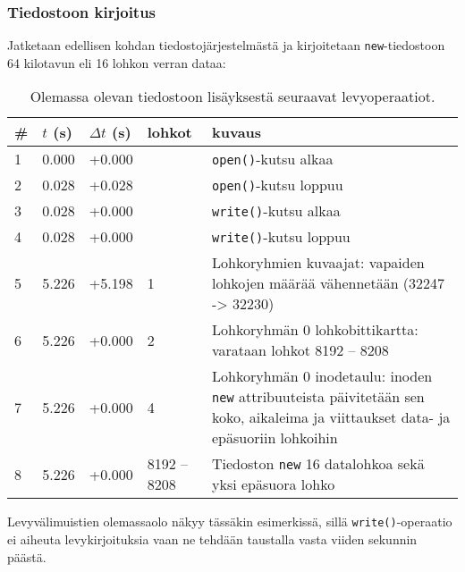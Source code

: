 \subsubsection{Tiedostoon kirjoitus}
\label{ChapExt2FileWrite}
Jatketaan edellisen kohdan tiedostojärjestelmästä ja kirjoitetaan \texttt{new}-tiedostoon 64 kilotavun eli 16 lohkon verran dataa:
\begin{table}[H]
\begin{tabular}{l | l | l | l | p{7cm}}
    \# & $t$ (s) & $\Delta t$ (s) & lohkot & kuvaus \\ \hline \hline
    1  & 0.000    & +0.000   &            & \texttt{open()}-kutsu alkaa    \\ \hline %
    2  & 0.028    & +0.028   &            & \texttt{open()}-kutsu loppuu   \\ \hline %
    3  & 0.028    & +0.000   &            & \texttt{write()}-kutsu alkaa   \\ \hline %
    4  & 0.028    & +0.000   &            & \texttt{write()}-kutsu loppuu  \\ \hline %
    5  & 5.226    & +5.198   & 1          & Lohkoryhmien kuvaajat: vapaiden lohkojen määrää vähennetään (32247 -> 32230)                             \\ \hline %
    6  & 5.226    & +0.000   & 2          & Lohkoryhmän 0 lohkobittikartta: varataan lohkot 8192 -- 8208         \\ \hline %
    7  & 5.226    & +0.000   & 4          & Lohkoryhmän 0 inodetaulu: inoden \texttt{new} attribuuteista päivitetään sen koko, aikaleima ja viittaukset data- ja epäsuoriin lohkoihin               \\ \hline %
    8  & 5.226    & +0.000   & 8192 -- 8208 & Tiedoston \texttt{new} 16 datalohkoa sekä yksi epäsuora lohko                            \\        %
\end{tabular}
\caption{Olemassa olevan tiedostoon lisäyksestä seuraavat levyoperaatiot.}
\end{table}

Levyvälimuistien olemassaolo näkyy tässäkin esimerkissä,
sillä \texttt{write()}-operaatio ei aiheuta levykirjoituksia vaan ne tehdään taustalla vasta viiden sekunnin päästä.

